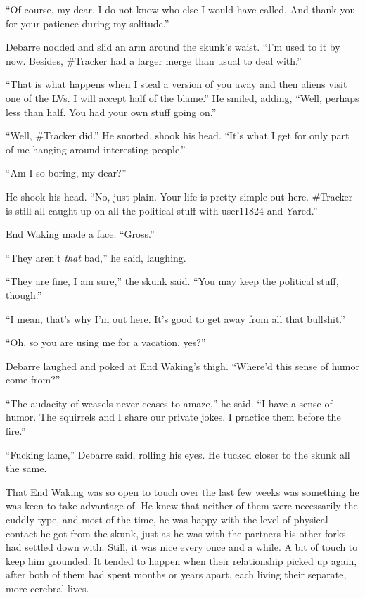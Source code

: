 ``Of course, my dear. I do not know who else I would have called. And thank you for your patience during my solitude.''

Debarre nodded and slid an arm around the skunk's waist. ``I'm used to it by now. Besides, \#Tracker had a larger merge than usual to deal with.''

``That is what happens when I steal a version of you away and then aliens visit one of the LVs. I will accept half of the blame.'' He smiled, adding, ``Well, perhaps less than half. You had your own stuff going on.''

``Well, \#Tracker did.'' He snorted, shook his head. ``It's what I get for only part of me hanging around interesting people.''

``Am I so boring, my dear?''

He shook his head. ``No, just plain. Your life is pretty simple out here. \#Tracker is still all caught up on all the political stuff with user11824 and Yared.''

End Waking made a face. ``Gross.''

``They aren't \emph{that} bad,'' he said, laughing.

``They are fine, I am sure,'' the skunk said. ``You may keep the political stuff, though.''

``I mean, that's why I'm out here. It's good to get away from all that bullshit.''

``Oh, so you are using me for a vacation, yes?''

Debarre laughed and poked at End Waking's thigh. ``Where'd this sense of humor come from?''

``The audacity of weasels never ceases to amaze,'' he said. ``I have a sense of humor. The squirrels and I share our private jokes. I practice them before the fire.''

``Fucking lame,'' Debarre said, rolling his eyes. He tucked closer to the skunk all the same.

That End Waking was so open to touch over the last few weeks was something he was keen to take advantage of. He knew that neither of them were necessarily the cuddly type, and most of the time, he was happy with the level of physical contact he got from the skunk, just as he was with the partners his other forks had settled down with. Still, it was nice every once and a while. A bit of touch to keep him grounded. It tended to happen when their relationship picked up again, after both of them had spent months or years apart, each living their separate, more cerebral lives.

